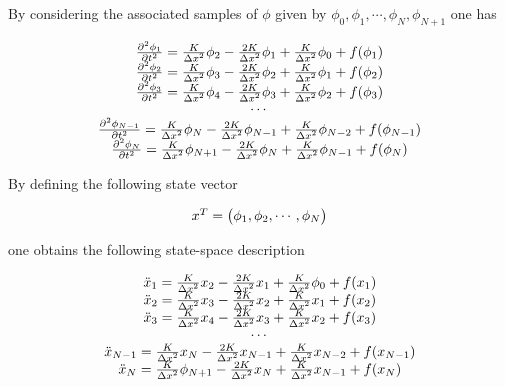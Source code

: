 \documentclass[journal]{IEEEtran}
\begin{document}
\noindent By considering the associated samples of $\phi$ given by $\phi_0, \phi_1, \cdots, \phi_N, \phi_{N+1}$
one has

\begin{equation}  \label{nonlinear_wave_eq3}
\begin{tabular}{c}
${{{{\partial}^2}\phi_1} \over {{\partial}t^2}}={K \over {{\Delta}x}^2}\phi_{2}-{{2K} \over {{\Delta}x}^2}\phi_1+{K \over {{\Delta}x}^2}\phi_{0}+f(\phi_1)$ \\
${{{{\partial}^2}\phi_2} \over {{\partial}t^2}}={K \over {{\Delta}x}^2}\phi_{3}-{{2K} \over {{\Delta}x}^2}\phi_2+{K \over {{\Delta}x}^2}\phi_{1}+f(\phi_2)$ \\
${{{{\partial}^2}\phi_3} \over {{\partial}t^2}}={K \over {{\Delta}x}^2}\phi_{4}-{{2K} \over {{\Delta}x}^2}\phi_3+{K \over {{\Delta}x}^2}\phi_{2}+f(\phi_3)$ \\
$\cdots$ \\
${{{{\partial}^2}\phi_{N-1}} \over {{\partial}t^2}}={K \over {{\Delta}x}^2}\phi_{N}-{{2K} \over {{\Delta}x}^2}\phi_{N-1}+{K \over {{\Delta}x}^2}\phi_{N-2}+f(\phi_{N-1})$ \\
${{{{\partial}^2}\phi_{N}} \over {{\partial}t^2}}={K \over {{\Delta}x}^2}\phi_{N+1}-{{2K} \over {{\Delta}x}^2}\phi_{N}+{K \over {{\Delta}x}^2}\phi_{N-1}+f(\phi_{N})$
\end{tabular}
\end{equation}

\noindent By defining the following state vector

\begin{equation} \label{state_vector_eq}
\begin{tabular}{c}
$x^T=\begin{pmatrix}
\phi_1,\phi_2,\cdots,\phi_N
\end{pmatrix}$
\end{tabular}
\end{equation}

\noindent one obtains the following state-space description

\begin{equation} \label{state_space_description1}
\begin{tabular}{c}
$\ddot{x}_1={K \over {{\Delta}x}^2}x_2-{{2K} \over {{\Delta}x}^2}{x_1}+{K \over {{\Delta}x}^2}{\phi_0}+f(x_1)$ \\
$\ddot{x}_2={K \over {{\Delta}x}^2}x_3-{{2K} \over {{\Delta}x}^2}{x_2}+{K \over {{\Delta}x}^2}{x_1}+f(x_2)$ \\
$\ddot{x}_3={K \over {{\Delta}x}^2}x_4-{{2K} \over {{\Delta}x}^2}{x_3}+{K \over {{\Delta}x}^2}{x_2}+f(x_3)$ \\
$\cdots$ \\
$\ddot{x}_{N-1}={K \over {{\Delta}x}^2}x_{N}-{{2K} \over {{\Delta}x}^2}{x_{N-1}}+{K \over {{\Delta}x}^2}{x_{N-2}}+f(x_{N-1})$\\
$\ddot{x}_{N}={K \over {{\Delta}x}^2}\phi_{N+1}-{{2K} \over {{\Delta}x}^2}{x_{N}}+{K \over
{{\Delta}x}^2}{x_{N-1}}+f(x_{N})$
\end{tabular}
\end{equation}
\end{document}
